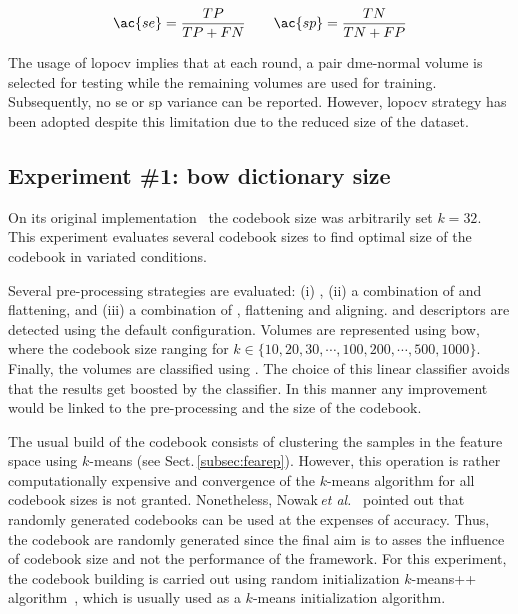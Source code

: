 \begin{align}
 \ac{se}  = \frac{TP}{TP+FN} \qquad \ac{sp} = \frac{TN}{TN+FP}
 \label{eq:sesp}
\end{align}

The usage of \ac{lopocv} implies that at each round, a pair \ac{dme}-normal volume is selected for testing while the remaining volumes are used for training.
Subsequently, no \ac{se} or \ac{sp} variance can be reported.
However, \ac{lopocv} strategy has been adopted despite this limitation due to the reduced size of the dataset.

\subsection{Experiment \#1: \acs{bow} dictionary size}\label{subsec:exp1}
%
%
%
%

On its original implementation~\cite{Lemaitre2015, Lemaintre2015miccaiOCT} the codebook size was arbitrarily set $k=32$.
This experiment evaluates several codebook sizes to find optimal size of the codebook in variated conditions.

Several pre-processing strategies are evaluated: (i) \nlm, (ii) a combination of \nlm and flattening, and (iii) a combination of \nlm, flattening and aligning.
\lbp and \lbptop descriptors are detected using the default configuration.
Volumes are represented using \ac{bow}, where the codebook size ranging for $k \in \{10, 20, 30, \cdots, 100, 200, \cdots, 500, 1000\}$.
Finally, the volumes are classified using \lr.
The choice of this linear classifier avoids that the results get boosted by the classifier. In this manner any improvement would be linked to the pre-processing and the size of the codebook.
%

The usual build of the codebook consists of clustering the samples in the feature space using $k$-means (see Sect.\,\ref{subsec:fearep}).
However, this operation is rather computationally expensive and convergence of the $k$-means algorithm for all codebook sizes is not granted.
Nonetheless, Nowak\,\textit{et al.}~\cite{nowak2006sampling} pointed out that randomly generated codebooks can be used at the expenses of accuracy.
Thus, the codebook are randomly generated since the final aim is to asses the influence of codebook size and not the performance of the framework.
For this experiment, the codebook building is carried out using random initialization $k$-means++ algorithm~\cite{arthur2007k}, which is usually used as a $k$-means initialization algorithm.


